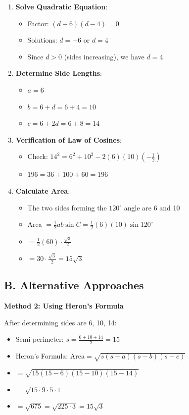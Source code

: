 \documentclass[12pt]{article}
\begin{document}
\begin{solutionbox}
\begin{enumerate}[leftmargin=*]
    \item \textbf{Solve Quadratic Equation}:
    \begin{itemize}
        \item Factor: $(d+6)(d-4) = 0$
        \item Solutions: $d = -6$ or $d = 4$
        \item Since $d > 0$ (sides increasing), we have $d = 4$
    \end{itemize}
    
    \item \textbf{Determine Side Lengths}:
    \begin{itemize}
        \item $a = 6$
        \item $b = 6 + d = 6 + 4 = 10$
        \item $c = 6 + 2d = 6 + 8 = 14$
    \end{itemize}
    
    \item \textbf{Verification of Law of Cosines}:
    \begin{itemize}
        \item Check: $14^2 = 6^2 + 10^2 - 2(6)(10)(-\frac{1}{2})$
        \item $196 = 36 + 100 + 60 = 196$ \checkmark
    \end{itemize}
    
    \item \textbf{Calculate Area}:
    \begin{itemize}
        \item The two sides forming the $120^\circ$ angle are 6 and 10
        \item Area $= \frac{1}{2}ab\sin C = \frac{1}{2}(6)(10)\sin 120^\circ$
        \item $= \frac{1}{2}(60) \cdot \frac{\sqrt{3}}{2}$
        \item $= 30 \cdot \frac{\sqrt{3}}{2} = 15\sqrt{3}$
    \end{itemize}
\end{enumerate}

\subsection*{B. Alternative Approaches}

\textbf{Method 2: Using Heron's Formula}

After determining sides are 6, 10, 14:
\begin{itemize}
    \item Semi-perimeter: $s = \frac{6 + 10 + 14}{2} = 15$
    \item Heron's Formula: $\text{Area} = \sqrt{s(s-a)(s-b)(s-c)}$
    \item $= \sqrt{15(15-6)(15-10)(15-14)}$
    \item $= \sqrt{15 \cdot 9 \cdot 5 \cdot 1}$
    \item $= \sqrt{675} = \sqrt{225 \cdot 3} = 15\sqrt{3}$
\end{itemize}


\end{solutionbox}
\end{document}

